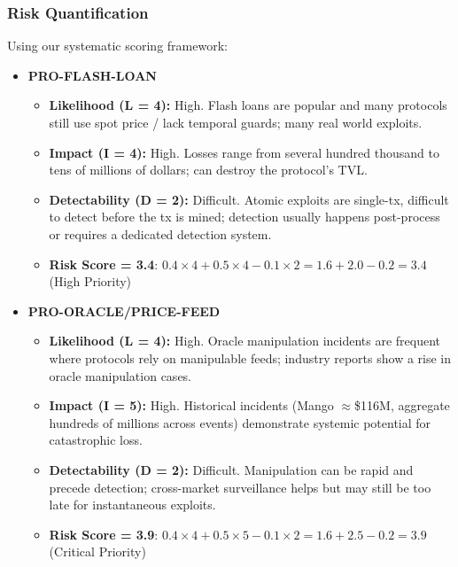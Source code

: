 \subsubsection{Risk Quantification}

Using our systematic scoring framework:

\begin{itemize}
    \item \textbf{PRO-FLASH-LOAN}
    \begin{itemize}
        \item \textbf{Likelihood (L = 4):} High. Flash loans are popular and many protocols still use spot price / lack temporal guards; many real world exploits. \cite{werapun2023faa, werner2022sok}
        \item \textbf{Impact (I = 4):} High. Losses range from several hundred thousand to tens of millions of dollars; can destroy the protocol's TVL. 
        \item \textbf{Detectability (D = 2):} Difficult. Atomic exploits are single-tx, difficult to detect before the tx is mined; detection usually happens post-process or requires a dedicated detection system. \cite{werapun2023faa}
        \item \textbf{Risk Score = 3.4}: $0.4 \times 4 + 0.5 \times 4 - 0.1 \times 2 = 1.6 + 2.0 - 0.2 = 3.4$ (High Priority)
    \end{itemize}
    
    \item \textbf{PRO-ORACLE/PRICE-FEED}
    \begin{itemize}
        \item \textbf{Likelihood (L = 4):} High. Oracle manipulation incidents are frequent where protocols rely on manipulable feeds; industry reports show a rise in oracle manipulation cases.\cite{chainalysis2023oracle}
        \item \textbf{Impact (I = 5):} High. Historical incidents (Mango $\approx$\$116M, aggregate hundreds of millions across events) demonstrate systemic potential for catastrophic loss. \cite{akartuna2022mango}
        \item \textbf{Detectability (D = 2):} Difficult. Manipulation can be rapid and precede detection; cross-market surveillance helps but may still be too late for instantaneous exploits. \cite{solidus2022mango}
        \item \textbf{Risk Score = 3.9}: $0.4 \times 4 + 0.5 \times 5 - 0.1 \times 2 = 1.6 + 2.5 - 0.2 = 3.9$ (Critical Priority)
    \end{itemize}
\end{itemize}